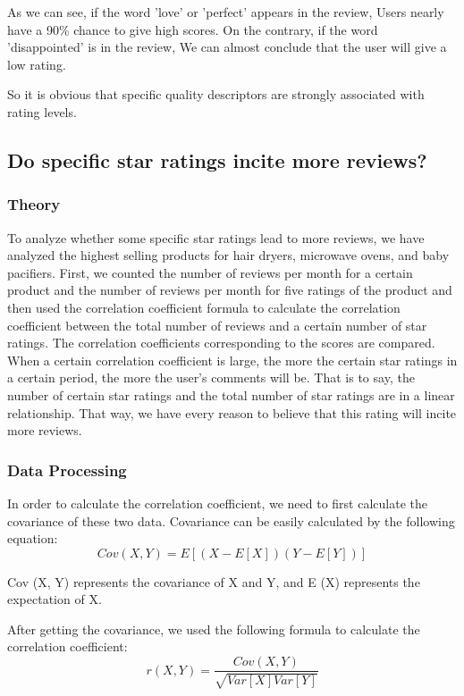 \documentclass{mcmthesis}
\begin{document}
	As we can see, if the word 'love' or 'perfect' appears in the review, Users nearly have a 90\% chance to give high scores. On the contrary, if the word 'disappointed' is in the review, We can almost conclude that the user will give a low rating.
	
	So it is obvious that specific quality descriptors are strongly associated with rating levels.
	
	\subsection{Do specific star ratings incite more reviews? }
	\subsubsection{Theory}
	
	To analyze whether some specific star ratings lead to more reviews, we have analyzed the highest selling products for hair dryers, microwave ovens, and baby pacifiers. First, we counted the number of reviews per month for a certain product and the number of reviews per month for five ratings of the product and then used the correlation coefficient formula to calculate the correlation coefficient between the total number of reviews and a certain number of star ratings. The correlation coefficients corresponding to the scores are compared. When a certain correlation coefficient is large, the more the certain star ratings in a certain period, the more the user's comments will be. That is to say, the number of certain star ratings and the total number of star ratings are in a linear relationship. That way, we have every reason to believe that this rating will incite more reviews.
	
	\subsubsection{Data Processing}
	
	In order to calculate the correlation coefficient, we need to first calculate the covariance of these two data. Covariance can be easily calculated by the following equation:
	$$Cov(X,Y)=E[(X-E[X])(Y-E[Y])]$$
	
	Cov (X, Y) represents the covariance of X and Y, and E (X) represents the expectation of X.
	
	After getting the covariance, we used the following formula to calculate the correlation coefficient:
	$$r(X,Y)=\frac{Cov(X,Y)}{\sqrt{Var[X]Var[Y]}}$$
	
\end{document}
